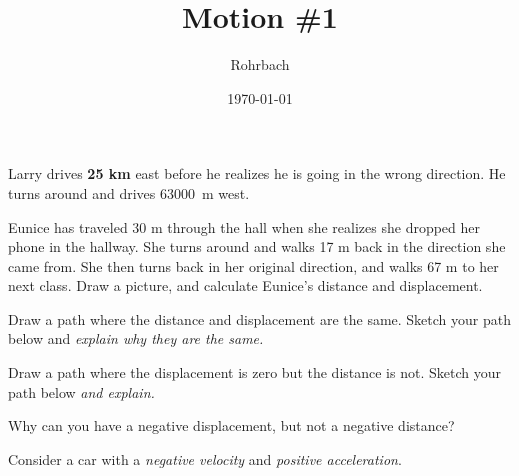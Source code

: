 \documentclass[10pt]{exam}
\title{Motion \#1}
\author{Rohrbach}
\date{\today}
\begin{document}
\maketitle

\begin{questions}
  \question 
    Larry drives {\bf  25 km} east before he realizes he is going in the wrong direction.  He turns around and drives \SI{63000}{\meter} west.

    

  \question
    Eunice has traveled 30 m through the hall when she realizes she dropped her phone in the hallway.  She turns around and walks 17 m back in the direction she came from.  She then turns back in her original direction, and walks 67 m to her next class.  Draw a picture, and calculate Eunice's distance and displacement.
    \vs[2]
  
  \question
    Draw a path where the distance and displacement are the same.  Sketch your path below and \emph{explain why they are the same.}
    \vs

  \question
    Draw a path where the displacement is zero but the distance is not.  Sketch your path below \emph{and explain.}
    \vs

  \pagebreak

  \question
    Why can you have a negative displacement, but not a negative distance?
    \vs

  \question
    Consider a car with a \emph{negative velocity} and \emph{positive acceleration}.


\end{questions}
\end{document}
